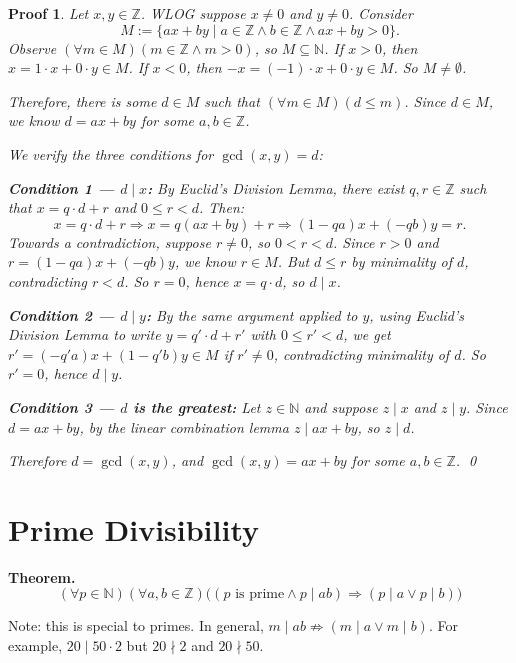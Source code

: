 \documentclass[12pt]{article}
\theoremstyle{proofstyle}
\newtheorem*{proof*}{Proof}
\begin{document}
\begin{proof*}
    Let $x, y \in \mathbb{Z}$. WLOG suppose $x \neq 0$ and $y \neq 0$.
    Consider
    \[
        M := \{ax + by \mid a \in \mathbb{Z} \wedge b \in \mathbb{Z} \wedge ax + by > 0\}.
    \]
    Observe $(\forall m \in M)(m \in \mathbb{Z} \wedge m > 0)$, so $M \subseteq \mathbb{N}$.
    If $x > 0$, then $x = 1 \cdot x + 0 \cdot y \in M$. If $x < 0$, then
    $-x = (-1) \cdot x + 0 \cdot y \in M$. So $M \neq \emptyset$.

    Therefore, there is some $d \in M$ such that $(\forall m \in M)(d \leq m)$.
    Since $d \in M$, we know $d = ax + by$ for some $a, b \in \mathbb{Z}$.

    We verify the three conditions for $\gcd(x, y) = d$:

    \textbf{Condition 1 --- $d \mid x$:} By Euclid's Division Lemma, there exist
    $q, r \in \mathbb{Z}$ such that $x = q \cdot d + r$ and $0 \leq r < d$. Then:
    \[
        x = q \cdot d + r \Rightarrow x = q(ax+by) + r
        \Rightarrow (1-qa)x + (-qb)y = r.
    \]
    Towards a contradiction, suppose $r \neq 0$, so $0 < r < d$. Since $r > 0$
    and $r = (1-qa)x + (-qb)y$, we know $r \in M$. But $d \leq r$ by minimality
    of $d$, contradicting $r < d$. So $r = 0$, hence $x = q \cdot d$, so $d \mid x$.

    \textbf{Condition 2 --- $d \mid y$:} By the same argument applied to $y$,
    using Euclid's Division Lemma to write $y = q' \cdot d + r'$ with $0 \leq r' < d$,
    we get $r' = (- q'a)x + (1 - q'b)y \in M$ if $r' \neq 0$, contradicting
    minimality of $d$. So $r' = 0$, hence $d \mid y$.

    \textbf{Condition 3 --- $d$ is the greatest:} Let $z \in \mathbb{N}$ and
    suppose $z \mid x$ and $z \mid y$. Since $d = ax + by$, by the linear
    combination lemma $z \mid ax + by$, so $z \mid d$.

    Therefore $d = \gcd(x, y)$, and $\gcd(x,y) = ax + by$ for some
    $a, b \in \mathbb{Z}$. \qed
\end{proof*}
\section*{Prime Divisibility}

\textbf{Theorem.}
\[
    (\forall p \in \mathbb{N})(\forall a, b \in \mathbb{Z})
    \Big((p \text{ is prime} \wedge p \mid ab) \Rightarrow (p \mid a \vee p \mid b)\Big)
\]

Note: this is special to primes. In general, $m \mid ab \not\Rightarrow (m \mid a \vee m \mid b)$.
For example, $20 \mid 50 \cdot 2$ but $20 \nmid 2$ and $20 \nmid 50$.
\end{document}
